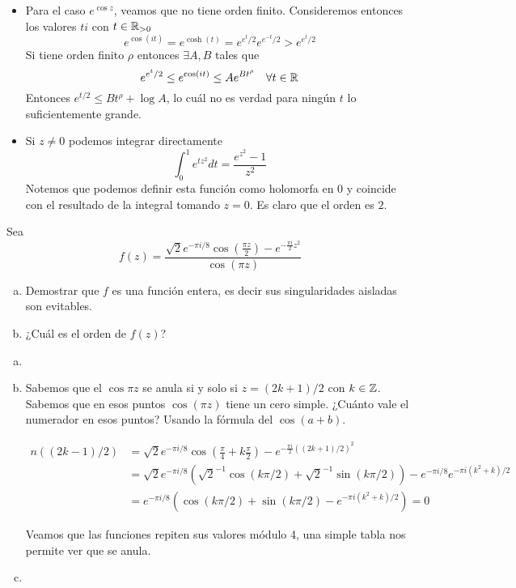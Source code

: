 \documentclass[twoside]{article}
\begin{document}
\begin{solucion}
\begin{itemize}
\item Para el caso $e^{\cos z}$, veamos que no tiene orden finito. Consideremos entonces los valores $ti$ con $t\in \mathbb{R}_{>0}$
$$
e^{\cos(it)}=e^{\cosh(t)}=e^{e^t/2}e^{e^{-t}/2} > e^{e^t/2}
$$
Si tiene orden finito $\rho$ entonces $\exists A, B$ tales que
$$
e^{e^t/2} \leq e^{\cos(it)} \leq Ae^{Bt^\rho} \quad \forall t\in \mathbb{R}$$
Entonces $e^{t/2}\leq Bt^\rho+\log A$, lo cuál no es verdad para ningún $t$ lo suficientemente grande.
\item Si $z\neq 0$ podemos integrar directamente
$$
\int_0^1 e^{tz^2}dt = \frac{e^{z^2}-1}{z^2}
$$
Notemos que podemos definir esta función como holomorfa en $0$ y coincide con el resultado de la integral tomando $z=0$. Es claro que el orden es $2$.
\end{itemize}

\end{solucion}

\newpage

\begin{ejercicio}{2}
Sea
$$
f(z)=\frac{\sqrt{2}e^{-\pi i/8}\cos\left(\frac{\pi z}{2}\right)-e^{-\frac{\pi i}{2}z^2}}{\cos(\pi z)}
$$
\begin{enumerate}[(a)]
\item Demostrar que $f$ es una función entera, es decir sus singularidades aisladas son evitables.
\item ¿Cuál es el orden de $f(z)$?
\end{enumerate}
\end{ejercicio}
\begin{solucion}
\begin{enumerate}[(a)]
\item[]
\item Sabemos que el $\cos \pi z$ se anula si y solo si $z=(2k+1)/2$ con $k\in \mathbb{Z}$. Sabemos que en esos puntos $\cos(\pi z)$ tiene un cero simple. ¿Cuánto vale el numerador en esos puntos? Usando la fórmula del $\cos(a+b)$.

\begin{align*}
n((2k-1)/2)&=\sqrt{2}e^{-\pi i/8}\cos\left(\frac{\pi}{4}+k\frac{\pi}{2}\right)-e^{-\frac{\pi i}{2}((2k+1)/2)^2} \\
&= \sqrt{2}e^{-\pi i/8}(\sqrt{2}^{-1}\cos(k\pi/2)+\sqrt{2}^{-1}\sin(k\pi/2))-e^{-\pi i/8}e^{-\pi i (k^2+k)/2}\\
&=e^{-\pi i/8}(\cos(k\pi/2)+\sin(k\pi/2)-e^{-\pi i (k^2+k)/2}) = 0
\end{align*}

Veamos que las funciones repiten sus valores módulo 4, una simple tabla nos permite ver que se anula.
\item 
\end{enumerate}
\end{solucion}
\end{document}
